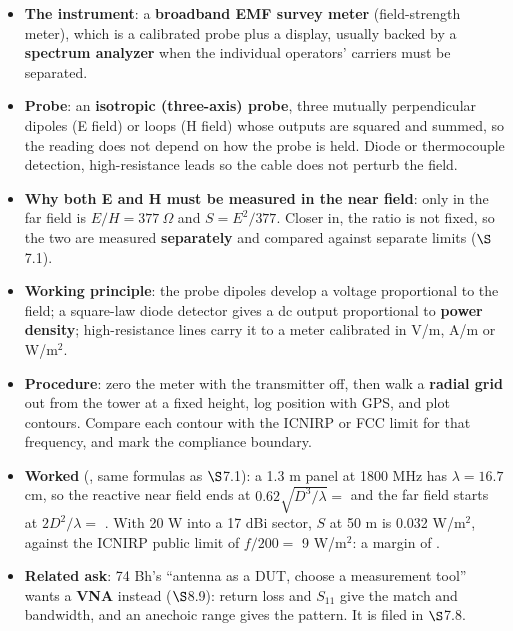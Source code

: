 \begin{itemize}
  \item \textbf{The instrument}: a \textbf{broadband EMF survey meter} (field-strength
    meter), which is a calibrated probe plus a display, usually backed by a
    \textbf{spectrum analyzer} when the individual operators' carriers must be separated.
  \item \textbf{Probe}: an \textbf{isotropic (three-axis) probe}, three mutually
    perpendicular dipoles (E field) or loops (H field) whose outputs are squared and summed,
    so the reading does not depend on how the probe is held. Diode or thermocouple detection,
    high-resistance leads so the cable does not perturb the field.
  \item \textbf{Why both E and H must be measured in the near field}: only in the far field
    is $E/H = 377\ \Omega$ and $S = E^2/377$. Closer in, the ratio is not fixed, so the two
    are measured \textbf{separately} and compared against separate limits ($\S$7.1).
  \item \textbf{Working principle}: the probe dipoles develop a voltage proportional to the
    field; a square-law diode detector gives a dc output proportional to \textbf{power
    density}; high-resistance lines carry it to a meter calibrated in V/m, A/m or
    W/m$^2$.
  \item \textbf{Procedure}: zero the meter with the transmitter off, then walk a
    \textbf{radial grid} out from the tower at a fixed height, log position with GPS, and
    plot contours. Compare each contour with the ICNIRP or FCC limit for that frequency, and
    mark the compliance boundary.
  \item \textbf{Worked} (, same formulas as $\S$7.1): a 1.3 m panel at
    1800 MHz has $\lambda = 16.7$ cm, so the reactive near field ends at
    $0.62\sqrt{D^3/\lambda} = $  and the far field starts at
    $2D^2/\lambda = $ . With 20 W into a 17 dBi sector, $S$ at 50 m is
    0.032 W/m$^2$, against the ICNIRP public limit of $f/200 = $ 9 W/m$^2$: a margin of
    .
  \item \textbf{Related ask}: 74 Bh's ``antenna as a DUT, choose a measurement tool''
     wants a \textbf{VNA} instead ($\S$8.9): return loss and $S_{11}$ give the match and
    bandwidth, and an anechoic range gives the pattern. It is filed in $\S$7.8.
\end{itemize}

\vspace{2pt}

